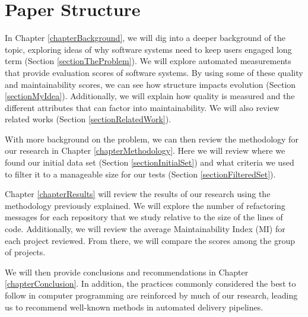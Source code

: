 \section{Paper Structure}


In Chapter \ref{chapterBackground}, we will dig into a deeper background of the topic, exploring ideas of why software systems need to keep users engaged long term (Section \ref{sectionTheProblem}). We will explore automated measurements that provide evaluation scores of software systems. By using some of these quality and maintainability scores, we can see how structure impacts evolution (Section \ref{sectionMyIdea}). Additionally, we will explain how quality is measured and the different attributes that can factor into maintainability. We will also review related works (Section \ref{sectionRelatedWork}).


With more background on the problem, we can then review the methodology for our research in Chapter \ref{chapterMethodology}. Here we will review where we found our initial data set (Section \ref{sectionInitialSet}) and what criteria we used to filter it to a manageable size for our tests (Section \ref{sectionFilteredSet}).


Chapter \ref{chapterResults} will review the results of our research using the methodology previously explained. We will explore the number of refactoring messages for each repository that we study relative to the size of the lines of code. Additionally, we will review the average Maintainability Index (MI) for each project reviewed. From there, we will compare the scores among the group of projects.


We will then provide conclusions and recommendations in Chapter \ref{chapterConclusion}. In addition, the practices commonly considered the best to follow in computer programming are reinforced by much of our research, leading us to recommend well-known methods in automated delivery pipelines.
